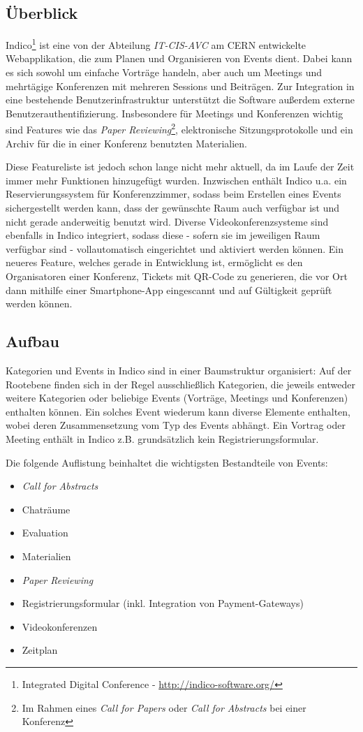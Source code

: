 \subsection{Überblick}
Indico\footnote{Integrated Digital Conference - \href{http://indico-software.org/}{http://indico-software.org/}}
ist eine von der Abteilung \emph{IT-CIS-AVC} am CERN entwickelte Webapplikation, die zum Planen und
Organisieren von Events dient. Dabei kann es sich sowohl um einfache Vorträge handeln, aber auch um
Meetings und mehrtägige Konferenzen mit mehreren Sessions und Beiträgen. Zur Integration in eine
bestehende Benutzerinfrastruktur unterstützt die Software außerdem externe
Benutzerauthentifizierung. Insbesondere für Meetings und Konferenzen wichtig sind Features wie das
\emph{Paper Reviewing}\footnote{Im Rahmen eines \emph{Call for Papers} oder \emph{Call for
Abstracts} bei einer Konferenz}, elektronische Sitzungsprotokolle und ein Archiv für die in einer
Konferenz benutzten Materialien. \citep{indico}

Diese Featureliste ist jedoch schon lange nicht mehr aktuell, da im Laufe der Zeit immer mehr
Funktionen hinzugefügt wurden. Inzwischen enthält Indico u.a. ein Reservierungssystem für
Konferenzzimmer, sodass beim Erstellen eines Events sichergestellt werden kann, dass der gewünschte
Raum auch verfügbar ist und nicht gerade anderweitig benutzt wird. Diverse Videokonferenzsysteme
sind ebenfalls in Indico integriert, sodass diese - sofern sie im jeweiligen Raum verfügbar sind -
vollautomatisch eingerichtet und aktiviert werden können. Ein neueres Feature, welches gerade in
Entwicklung ist, ermöglicht es den Organisatoren einer Konferenz, Tickets mit QR-Code zu generieren,
die vor Ort dann mithilfe einer Smartphone-App eingescannt und auf Gültigkeit geprüft werden können.

\subsection{Aufbau}
Kategorien und Events in Indico sind in einer Baumstruktur organisiert: Auf der Rootebene finden
sich in der Regel ausschließlich Kategorien, die jeweils entweder weitere Kategorien oder beliebige
Events (Vorträge, Meetings und Konferenzen) enthalten können. Ein solches Event wiederum kann
diverse Elemente enthalten, wobei deren Zusammensetzung vom Typ des Events abhängt. Ein Vortrag oder
Meeting enthält in Indico z.B. grundsätzlich kein Registrierungsformular.

Die folgende Auflistung beinhaltet die wichtigsten Bestandteile von Events:
\begin{itemize}
\item \emph{Call for Abstracts}
\item Chaträume
\item Evaluation
\item Materialien
\item \emph{Paper Reviewing}
\item Registrierungsformular (inkl. Integration von Payment-Gateways)
\item Videokonferenzen
\item Zeitplan
\end{itemize}


